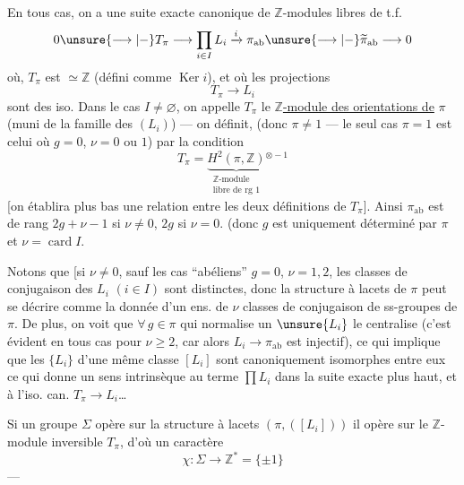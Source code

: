 En tous cas, on a une suite exacte
canonique de $\mathbb Z$-modules libres de t.f.
\[
0\unsure{\longrightarrow|-}T_\pi\longrightarrow\prod_{i\in I}L_i
\xrightarrow{i}\pi_{\mathrm{ab}}\unsure{\longrightarrow|-}\widetilde\pi_{\mathrm{ab}}\longrightarrow0
\]
où,  $T_\pi$ est $\simeq\mathbb Z$ (défini comme $\operatorname{Ker}i$), et où
les projections
\[
T_\pi\longrightarrow L_i
\]
sont des iso. Dans le cas $I\ne\varnothing$, on
appelle $T_\pi$ le \uline{$\mathbb Z$-module des orientations de}
$\pi$ (muni de la famille des $(L_i)$) ---
on définit,  
(donc $\pi\ne1$ --- le seul cas $\pi=1$ est celui où
$g=0$, $\nu=0$ ou $1$) par la condition
\[
T_\pi=\underbrace{H^2(\pi,\mathbb Z)}_{\substack{\mathbb Z\text{-module}\\\text{libre de rg }1}}{}^{\otimes-1}
\]
[on établira plus bas une relation entre les
deux définitions de $T_\pi$]. Ainsi $\pi_{\mathrm{ab}}$
est  de rang $2g+\nu-1$ si $\nu\ne0$, $2g$ si $\nu=0$.
(donc $g$ est uniquement déterminé par $\pi$ et $\nu=\operatorname{card}I$.



Notons que [si $\nu\ne0$, \inserted{et]} sauf les cas ``abéliens''
$g=0$, $\nu=1,2$, les classes de conjugaison
des $L_i$ $(i\in I)$ sont distinctes, donc la
structure à lacets de $\pi$ peut se décrire
comme la donnée d'un ens. de $\nu$ classes de
conjugaison de ss-groupes de $\pi$. De plus,
on voit que $\forall\,g\in\pi$ qui normalise
un $\unsure{L_i}$ le centralise (c'est évident
en tous cas pour $\nu\ge2$, car alors
$L_i\to\pi_{\mathrm{ab}}$ est injectif), ce qui implique
que les $\{L_i\}$ d'une même classe $[L_i]$
sont canoniquement isomorphes entre eux
ce qui donne un sens intrinsèque au
terme $\prod L_i$ dans la suite exacte
plus haut, et à l'iso. can. $T_\pi\to L_i$\dots
{}

Si un groupe $\Sigma$ opère sur la structure
à lacets $(\pi,([L_i]))$ il opère sur le
$\mathbb Z$-module inversible $T_\pi$, d'où un
caractère
\[
\chi:\Sigma\longrightarrow\mathbb Z^{*}=\{\pm1\}
\]
---

